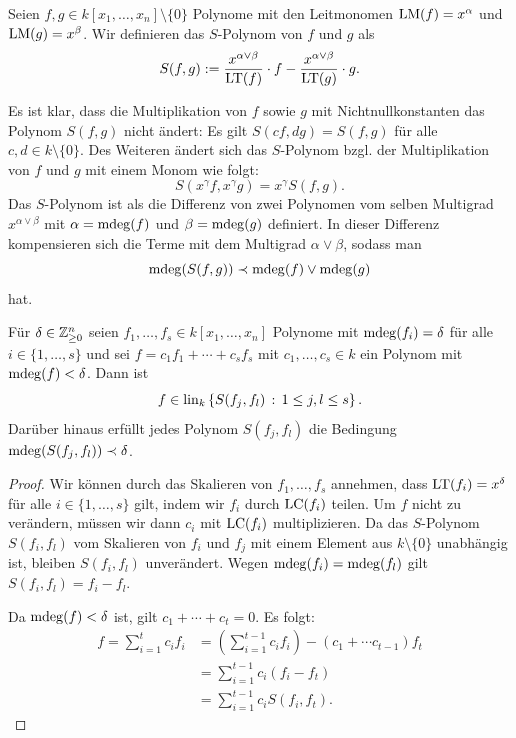 \documentclass[11pt]{article}
\numberwithin{equation}{section}
\begin{document}
\begin{definition}  Seien $f, g \in k[x_1,\ldots,x_n] \setminus \{0\}$ Polynome  mit den Leitmonomen $\operatorname{LM}(f) = x^\alpha$ und $\operatorname{LM}(g) = x^\beta$.  
	Wir definieren das $S$-Polynom von $f$ und $g$ als 
	\[
		S(f,g) := \frac{x^{\alpha \vee \beta}}{\operatorname{LT}(f)} \cdot f - \frac{x^{\alpha \vee \beta}}{\operatorname{LT}(g)} \cdot g. 
	\]
\end{definition} 

\begin{remark}
	Es ist klar, dass die Multiplikation von $f$ sowie $g$ mit Nichtnullkonstanten das Polynom $S(f,g)$ nicht ändert: Es gilt $S( c f , d g) = S(f,g)$ für alle $c,d \in k \setminus \{0\}$. Des Weiteren ändert sich das $S$-Polynom bzgl. der Multiplikation von $f$ und $g$ mit einem Monom wie folgt: 
	\[	S( x^\gamma f , x^\gamma g) = x^\gamma S(f,g). 
	\]
	Das $S$-Polynom ist als die Differenz von zwei Polynomen vom selben Multigrad $x^{\alpha \vee \beta}$ mit $\alpha = \operatorname{mdeg}(f)$ und $\beta = \operatorname{mdeg}(g)$ definiert. In dieser Differenz kompensieren sich die Terme mit dem Multigrad $\alpha \vee \beta$, sodass man 
	\[
		\operatorname{mdeg}(S(f,g)) \prec \operatorname{mdeg}(f) \vee \operatorname{mdeg}(g)
	\] hat. 
\end{remark} 


\begin{lemma} \label{s:paar:lem}
	Für $\delta \in \mathbb{Z}_{\ge 0}^n$ seien 
	$f_1,\ldots,f_s \in k[x_1,\ldots,x_n]$ Polynome mit $\operatorname{mdeg}(f_i) = \delta$ für alle $i \in \{1,\ldots,s\}$ und sei $f = c_1 f_1 + \cdots +c_s f_s$ mit $c_1,\ldots,c_s \in k$ ein Polynom mit $\operatorname{mdeg}(f)< \delta$. Dann ist 
	\[
		f \in \operatorname{lin}_k \left\{  S(f_j,f_l)  \,:\, 1 \le j,l \le s \right\}. 
	\]
	Darüber hinaus erfüllt jedes Polynom $S(f_j,f_l)$ die Bedingung $\operatorname{mdeg}(S(f_j,f_l)) \prec \delta$. 
	
\end{lemma} 
\begin{proof} 
		Wir können durch das Skalieren von $f_1,\ldots,f_s$ annehmen, dass $\operatorname{LT}(f_i) = x^\delta$ für alle $i \in \{1,\ldots,s\}$ gilt, indem wir $f_i$ durch $\operatorname{LC}(f_i)$ teilen. Um $f$ nicht zu verändern, müssen wir dann $c_i$ mit $\operatorname{LC}(f_i)$ multiplizieren. Da das $S$-Polynom $S(f_i,f_l)$ vom Skalieren von $f_i$ und $f_j$ mit einem Element aus $k \setminus \{0\}$ unabhängig ist, bleiben $S(f_i,f_l)$ unverändert. Wegen $\operatorname{mdeg}(f_i) = \operatorname{mdeg}(f_l)$ gilt $S(f_i,f_l) = f_i - f_l$. 
		
		Da $\operatorname{mdeg}(f) < \delta$ ist, gilt $c_1 + \cdots + c_t = 0$. Es folgt: 
		\begin{align*}
			f   = \sum_{i=1}^t c_i f_i & = \left( \sum_{i=1}^{t-1} c_i f_i  \right) - (c_1 + \cdots c_{t-1}) f_t
			\\ & = \sum_{i=1}^{t-1} c_i (f_i - f_t) 
			\\ & = \sum_{i=1}^{t-1} c_i S(f_i,f_t). 
		\end{align*}
\end{proof} 
\end{document}
